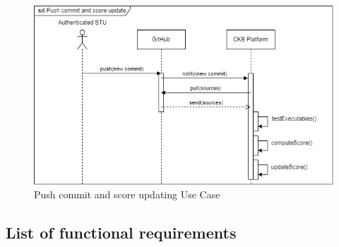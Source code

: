     \begin{figure}[H]
        \centering
        \includegraphics[width=1\textwidth]{images/sequence_diagrams/ClassDiagram-UC18-SequenceDiagram.png}
        \caption{Push commit and score updating Use Case}
        \label{fig:uc18}
    \end{figure}

\subsection{List of functional requirements}
